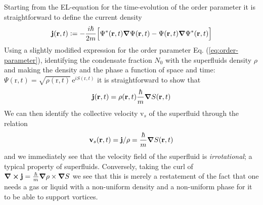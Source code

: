 \documentclass[12pt,a4paper]{book}
\renewcommand{\vec}[1]{\bm{\mathrm{#1}}}
\newcommand{\unit}[1]{\,\mathrm{#1}}
\begin{document}
			Starting from the EL-equation for the time-evolution of the order parameter it is straightforward to define the current density
			\begin{align}
				\vec{j}(\vec{r},t) \vcentcolon= -\frac{i\hbar}{2m}\qty\Big[\Psi^*(\vec{r},t)\grad{\Psi}(\vec{r},t) - \Psi(\vec{r},t)\grad{\Psi^*}(\vec{r},t)]
			\end{align}
			Using a slightly modified expression for the order parameter Eq. (\ref{eq:order-parameter}), identifying the condensate fraction $N_0$ with the superfluids density $\rho$ and making the density and the phase a function of space and time: $\Psi(\vec{r},t) = \sqrt{\rho(\vec{r},t)}\unit{e}^{iS(\vec{r},t)}$ it is straightforward to show that
			\begin{align}
				\vec{j}(\vec{r},t) = \rho(\vec{r},t)\frac{\hbar}{m}\grad{S(\vec{r},t)}
			\end{align} 
			We can then identify the collective velocity $\vec{v}_s$ of the superfluid through the relation
			\begin{align}
				\vec{v}_s(\vec{r},t) = \vec{j}/\rho=\frac{\hbar}{m}\grad{S(\vec{r},t)} \label{eq:velocity-field}
			\end{align}
			and we immediately see that the velocity field of the superfluid is \emph{irrotational}; a typical property of superfluids. Conversely, taking the curl of $\curl{\vec{j}}=\frac{\hbar}{m}\grad{\rho}\times\grad{S}$ we see that this is merely a restatement of the fact that one needs a gas or liquid with a non-uniform density and a non-uniform phase for it to be able to support vortices.\\
			
\end{document}
